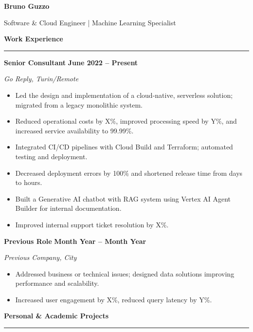 \documentclass[9pt, a4paper]{article}
\newcommand{\cvsection}[1]{%
	\vspace{8pt}\par
	{\Large\bfseries\color{sectionblue}#1}\par
	\vspace{2pt}\hrule\vspace{6pt}
}
\newcommand{\cvsubsection}[3]{%
	\par {\large\bfseries #1} \hfill {\bfseries #2} \par {\textit{#3}} \vspace{4pt}
}
\begin{document}
	
	\begin{center}
		{\Huge\bfseries Bruno Guzzo}\par
		\vspace{4pt}
		{\Large Software \& Cloud Engineer | Machine Learning Specialist}
	\end{center}
	\vspace{10pt}
	
	\begin{paracol}{2}
		\setlength{\columnsep}{1cm} %
		
		\cvsection{Work Experience}
		
		\cvsubsection{Senior Consultant}{June 2022 -- Present}{Go Reply, Turin/Remote}
		
		\begin{itemize}[leftmargin=*, nosep]
			\item Led the design and implementation of a cloud-native, serverless solution; migrated from a legacy monolithic system.
			\item Reduced operational costs by X\%, improved processing speed by Y\%, and increased service availability to 99.99\%.
			\item Integrated CI/CD pipelines with Cloud Build and Terraform; automated testing and deployment.
			\item Decreased deployment errors by 100\% and shortened release time from days to hours.
			\item Built a Generative AI chatbot with RAG system using Vertex AI Agent Builder for internal documentation.
			\item Improved internal support ticket resolution by X\%.
		\end{itemize}
		
		\vspace{6pt}
		\cvsubsection{Previous Role}{Month Year -- Month Year}{Previous Company, City}
		\begin{itemize}[leftmargin=*, nosep]
			\item Addressed business or technical issues; designed data solutions improving performance and scalability.
			\item Increased user engagement by X\%, reduced query latency by Y\%.
		\end{itemize}
		
		\cvsection{Personal \& Academic Projects}
		

\end{paracol}
\end{document}
